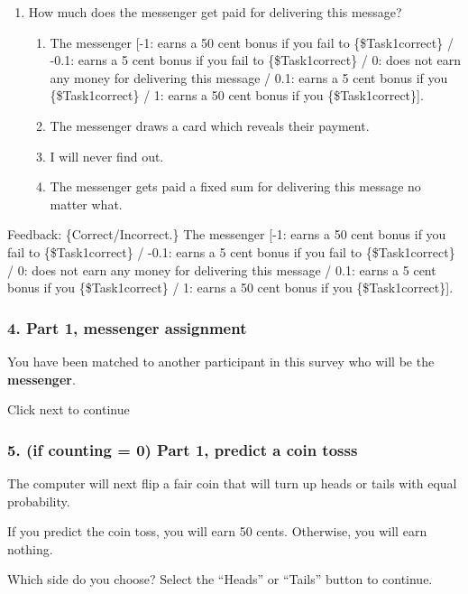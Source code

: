 \begin{description}[listparindent = 1.5em]
\item[Part 1 Quiz Question 4] \hspace{1cm} 
\begin{enumerate} 
\item How much does the messenger get paid for delivering this message?
\begin{enumerate}
\item The messenger [-1: earns a 50 cent bonus if you fail to \{\$Task1correct\} /
-0.1: earns a 5 cent bonus if you fail to \{\$Task1correct\} / 0: does not earn any
money for delivering this message / 0.1: earns a 5 cent bonus if you
\{\$Task1correct\} / 1: earns a 50 cent bonus if you \{\$Task1correct\}].
\item The messenger draws a card which reveals their payment.
\item I will never find out.
\item The messenger gets paid a fixed sum for delivering this message no matter what.
\end{enumerate} 
\end{enumerate}

Feedback: \{Correct/Incorrect.\} The messenger [-1: earns a 50 cent bonus if you
fail to \{\$Task1correct\} / -0.1: earns a 5 cent bonus if you fail to
\{\$Task1correct\} / 0: does not earn any money for delivering this message / 0.1:
earns a 5 cent bonus if you \{\$Task1correct\} / 1: earns a 50 cent bonus if you
\{\$Task1correct\}].
\end{description}

\subsubsection*{4. Part 1, messenger assignment}

You have been matched to another participant in this survey who will be the
\textbf{messenger}. 

Click next to continue

\subsubsection*{5. (if counting = 0) Part 1, predict a coin tosss}
The computer will next flip a fair coin that will turn up heads or tails with
equal probability. 

If you predict the coin toss, you will earn 50 cents.
Otherwise, you will earn nothing. 

Which side do you choose? Select the ``Heads''
or ``Tails'' button to continue. 

